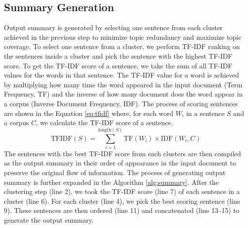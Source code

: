 \documentclass[acmlarge]{acmart}
\begin{document}
\subsection{Summary Generation}\label{subsec:summary-generation}
Output summary is generated by selecting one sentence from each cluster achieved in the previous step to minimize topic redundancy and maximize topic coverage. To select one sentence from a cluster, we perform TF-IDF ranking on the sentences inside a cluster and pick the sentence with the highest TF-IDF score. To get the TF-IDF score of a sentence, we take the sum of all TF-IDF values for the words in that sentence. The TF-IDF value for a word is achieved by multiplying how many time the word appeared in the input document (Term Frequency, TF) and the inverse of how many document does the word appear in a corpus (Inverse Document Frequency, IDF). The process of scoring sentences are shown in the Equation \ref{eq:tfidf} where, for each word $W_i$ in a sentence $S$ and a corpus $C$, we calculate the TF-IDF score of a sentence.
\begin{equation}\label{eq:tfidf}
	\text{TFIDF}(S) = \sum_{i=1}^{\text{length}(S)}\text{TF}(W_i) \times \text{IDF}(W_i,C)	
\end{equation}
The sentences with the best TF-IDF score from each clusters are then compiled as the output summary in their order of appearance in the input document to preserve the original flow of information. The process of generating output summary is further expanded in the Algorithm \ref{alg:summary}. After the clustering step (line 2), we took the TF-IDF score (line 7) of each sentence in a cluster (line 6). For each cluster (line 4), we pick the best scoring sentence (line 9). These sentences are then ordered (line 11) and concatenated (line 13--15) to generate the output summary.

\end{document}
